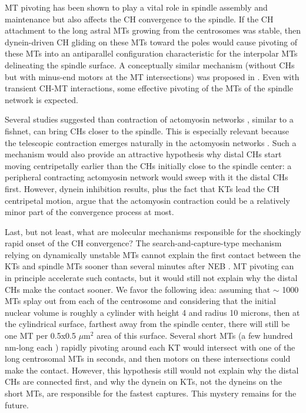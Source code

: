 \documentclass[times, twoside,onecolumn]{zHenriquesLab-StyleBioRxiv}
\begin{document}
 MT pivoting has been shown to play a vital role in spindle assembly and maintenance \cite{kalinina2013pivoting,edelmaier2020mechanisms,winters2019pivoting} but also affects the CH convergence to the spindle. If the CH attachment to the long astral MTs growing from the centrosomes was stable, then dynein-driven CH gliding on these MTs toward the poles would cause pivoting of these MTs into an antiparallel configuration characteristic for the interpolar MTs delineating the spindle surface. A conceptually similar mechanism (without CHs but with minus-end motors at the MT intersections) was proposed in \cite{winters2019pivoting}. Even with transient CH-MT interactions, some effective pivoting of the MTs of the spindle network is expected. 

Several studies suggested than contraction of actomyosin networks \cite{lenartContractileNuclearActin2005,boothContractileActomyosinNetwork2019}, similar to a fishnet, can bring CHs closer to the spindle. This is especially relevant because the telescopic contraction emerges naturally in the actomyosin networks \cite{linsmeierDisorderedActomyosinNetworks2016}. Such a mechanism would also provide an attractive hypothesis why distal CHs start moving centripetally earlier than the CHs initially close to the spindle center: a peripheral contracting actomyosin network would sweep with it the distal CHs first. However, dynein inhibition results, plus the fact that KTs lead the CH centripetal motion, argue that the actomyosin contraction could be a relatively minor part of the convergence process at most.

Last, but not least, what are molecular mechanisms responsible for the shockingly rapid onset of the CH convergence? The search-and-capture-type mechanism relying on dynamically unstable MTs cannot explain the first contact between the KTs and spindle MTs sooner than several minutes after NEB \cite{magidson2011spatial,magidson2015adaptive,kliuchnikov2022celldynamo}. MT pivoting can in principle accelerate such contacts, but it would still not explain why the distal CHs make the contact sooner. We favor the following idea: assuming that $\sim$ 1000 MTs splay out from each of the centrosome and considering that the initial nuclear volume is roughly a cylinder with height 4 and radius 10 microns, then at the cylindrical surface, farthest away from the spindle center, there will still be one MT per 0.5x0.5 $\mu$m$^2$ area of this surface. Several short MTs (a few hundred nm-long each \cite{sikirzhytski2018microtubules}) rapidly pivoting around each KT would intersect with one of the long centrosomal MTs in seconds, and then motors on these intersections could make the contact. However, this hypothesis still would not explain why the distal CHs are connected first, and why the dynein on KTs, not the dyneins on the short MTs, are responsible for the fastest captures. This mystery remains for the future.
\end{document}
